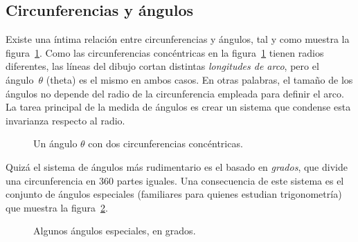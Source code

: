   \subsection{Circunferencias y ángulos} %
  \label{sec:circles_and_angles}

Existe una íntima relación entre circunferencias y ángulos, tal y como muestra la figura~\ref{fig:angle_arclength}. Como las circunferencias concéntricas en la figura~\ref{fig:angle_arclength} tienen radios diferentes, las líneas del dibujo cortan distintas \emph{longitudes de arco}, pero el ángulo~$\theta$ (theta) es el mismo en ambos casos. En otras palabras, el tamaño de los ángulos no depende del radio de la circunferencia empleada para definir el arco. La tarea principal de la medida de ángulos es crear un sistema que condense esta invarianza respecto al radio.

\begin{figure}
\begin{center}
\end{center}
\caption{Un ángulo $\theta$ con dos circunferencias concéntricas.\label{fig:angle_arclength}}
\end{figure}

Quizá el sistema de ángulos más rudimentario es el basado en  \emph{grados}, que divide una circunferencia en 360 partes iguales. Una consecuencia de este sistema es el conjunto de ángulos especiales (familiares para quienes estudian trigonometría) que muestra la figura~\ref{fig:degree_angles}.

\begin{figure}
\begin{center}
\end{center}
\caption{Algunos ángulos especiales, en grados.\label{fig:degree_angles}}
\end{figure}

